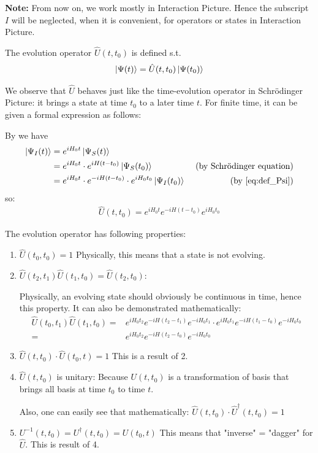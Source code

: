 \documentclass{article}
\numberwithin{equation}{subsection} %
\begin{document}
	\textbf{Note:} From now on, we work mostly in Interaction Picture. Hence the subscript $I$ will be neglected, when it is convenient, for operators or states in Interaction Picture.
	
	The evolution operator $\hat{U}(t,t_0)$ is defined s.t. 
	\begin{align}\ket{\Psi(t)}= \hat{U}(t,t_0) \ket{\Psi (t_0)}\end{align}
	
	We observe that $\hat{U}$ behaves just like the time-evolution operator in Schrödinger Picture: it brings a state at time $t_0$ to a later time $t$. For finite time, it can be given a formal expression as follows:
	
	By  we have
	\begin{align}
    	\ket{\Psi_I(t)} &= e^{iH_0t} \ket{\Psi_S(t)}
    	\\
    	&= e^{iH_0t}\cdot e^{iH(t-t_0)} \ket{\Psi_S(t_0)} &\text{    (by Schrödinger equation)}
    	\\
    	&= e^{iH_0t}\cdot e^{-iH(t-t_0)} \cdot e^{iH_0t_0} \ket{\Psi_I(t_0)} &\text{   (by \ref{eq:def_Psi})}
	\end{align}	
	so:
	\begin{align}\hat{U}(t,t_0)= e^{iH_0t} e^{-iH(t-t_0)} e^{iH_0t_0}\end{align}

	The evolution operator has following properties:
	
	\begin{enumerate}
		\item	$\hat{U}(t_0,t_0)=1$
		Physically, this means that a state is not evolving.

		\item	$\hat{U}(t_2,t_1) \hat{U}(t_1,t_0) =\hat{U}(t_2,t_0):$
	
    	Physically, an evolving state should obviously be continuous in time, hence this property. It can also be demonstrated mathematically:
    	\begin{align}
        	\hat{U}(t_0,t_1) \hat{U}(t_1,t_0) =& e^{iH_0t_2} e^{-iH(t_2-t_1)} e^{-iH_0t_1} 
        	\cdot  e^{iH_0t_1} e^{-iH(t_1-t_0)} e^{-iH_0t_0} 
        	\nonumber\\
        	=&  e^{iH_0t_2} e^{-iH(t_2-t_0)} e^{-iH_0t_0} \nonumber
    	\end{align}

		\item $\hat{U}(t,t_0) \cdot \hat{U}(t_0,t) = 1$
		This is a result of 2.

		\item $\hat{U}(t,t_0)$ is unitary:
		Because $U(t,t_0)$ is a transformation of basis that brings all basis at time $t_0$ to time $t$.
		
		Also, one can easily see that mathematically: $\hat{U}(t,t_0) \cdot \hat{U}^{\dagger}(t,t_0) = 1$
		
		\item  $U^{-1}(t,t_0) = U^{\dagger}(t,t_0) = U(t_0,t)$
		This means that "inverse" = "dagger" for $\hat{U}$. This is result of 4.
	\end{enumerate}
	
\end{document}
